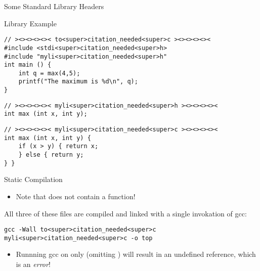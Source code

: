 \documentclass[11pt]{beamer}
\let\OldTexttt\texttt
\renewcommand{\texttt}[1]{\OldTexttt{\color{teal}{#1}}}
\begin{document}
\begin{frame}{Some Standard Library Headers}
\center
\
\end{frame}

\begin{frame}[fragile=singleslide]{Library Example} 
\begin{lstlisting}[style = C] 
// ><><><><>< to<super>citation_needed<super>c ><><><><><
#include <stdi<super>citation_needed<super>h>
#include "myli<super>citation_needed<super>h"
int main () {
	int q = max(4,5);
	printf("The maximum is %d\n", q);
}
\end{lstlisting}
\begin{lstlisting}[style = C] 
// ><><><><>< myli<super>citation_needed<super>h ><><><><><
int max (int x, int y);
\end{lstlisting}
\begin{lstlisting}[style = C]
// ><><><><>< myli<super>citation_needed<super>c ><><><><><
int max (int x, int y) {
	if (x > y) { return x;
	} else { return y;
} }
\end{lstlisting}
\end{frame}

\begin{frame}[fragile=singleslide]{Static Compilation}
\begin{itemize}
\item Note that \texttt{li<super>citation_needed<super>c} does not contain a \texttt{main} function!
\end{itemize}
All three of these files are compiled and linked with a single invokation of gcc:
\begin{lstlisting}[style=terminal]
gcc -Wall to<super>citation_needed<super>c myli<super>citation_needed<super>c -o top
\end{lstlisting}
\begin{itemize}
\item Runnning gcc on only \texttt{to<super>citation_needed<super>c} (omitting \texttt{myli<super>citation_needed<super>c}) will result in an undefined reference, which is an \textit{error}! 
\end{itemize}
\end{frame}
\end{document}
